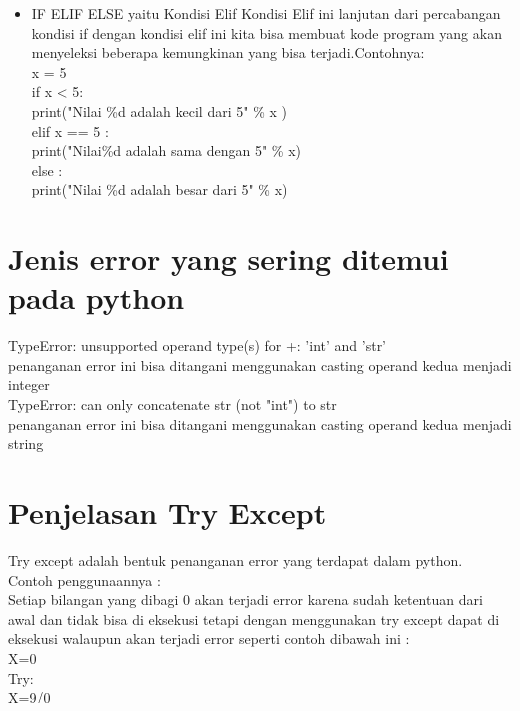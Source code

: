 \documentclass[a4paper,12pt]{report}
\begin{document}
\begin{itemize}
\item IF ELIF ELSE yaitu Kondisi Elif Kondisi Elif ini lanjutan dari percabangan kondisi if dengan kondisi elif ini kita bisa membuat kode program yang akan menyeleksi beberapa kemungkinan yang bisa terjadi.Contohnya:\\
x = 5\\
if x < 5:\\
	print("Nilai \%d adalah kecil dari 5" \% x )\\
elif x == 5 :\\
	print("Nilai\%d adalah sama dengan 5" \% x)\\
else :\\
	print("Nilai \%d adalah besar dari 5" \% x)\\
\end{itemize}
\section*{Jenis error yang sering ditemui pada python}
TypeError: unsupported operand type(s) for +: 'int' and 'str'\\
penanganan error ini bisa ditangani menggunakan casting operand kedua menjadi integer\\
TypeError: can only concatenate str (not "int") to str\\
penanganan error ini bisa ditangani menggunakan casting operand kedua menjadi string\\
\section*{Penjelasan Try Except}
Try except adalah bentuk penanganan error yang terdapat dalam python.\\
Contoh penggunaannya :\\
Setiap bilangan yang dibagi 0 akan terjadi error karena sudah ketentuan dari awal dan tidak bisa di eksekusi tetapi dengan menggunakan try except dapat di eksekusi walaupun akan terjadi error seperti contoh dibawah ini :\\
X=0\\
Try:\\
X=9/0\\
Except exception,e;\\
Print e\\
Print x=1\\
Maka akan muncul peringatan error integer division or modulo by zero 1\\

\section*{Keterampilan pemograman}
\end{document}
